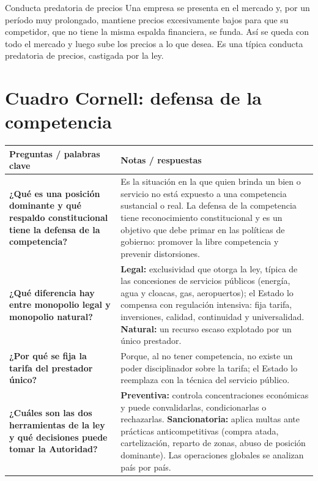 \documentclass[12pt,oneside]{book}
\newlength{\cornellizq}
\newlength{\cornellder}
\begin{document}
\begin{example}{Conducta predatoria de precios}
Una empresa se presenta en el mercado y, por un período muy prolongado, mantiene precios excesivamente bajos para que su competidor, que no tiene la misma espalda financiera, se funda. Así se queda con todo el mercado y luego sube los precios a lo que desea. Es una típica conducta predatoria de precios, castigada por la ley.
\end{example}

\section{Cuadro Cornell: defensa de la competencia}

\begin{longtable}{
    >{\raggedright\arraybackslash}p{\cornellizq}
    >{\raggedright\arraybackslash}p{\cornellder}
}
\toprule
\textbf{Preguntas / palabras clave} & \textbf{Notas / respuestas} \\
\midrule
\endhead

\textbf{¿Qué es una posición dominante y qué respaldo constitucional tiene la defensa de la competencia?} &
Es la situación en la que quien brinda un bien o servicio no está expuesto a una competencia sustancial o real. La defensa de la competencia tiene reconocimiento constitucional y es un objetivo que debe primar en las políticas de gobierno: promover la libre competencia y prevenir distorsiones. \\[0.8em]

\textbf{¿Qué diferencia hay entre monopolio legal y monopolio natural?} &
\textbf{Legal:} exclusividad que otorga la ley, típica de las concesiones de servicios públicos (energía, agua y cloacas, gas, aeropuertos); el Estado lo compensa con regulación intensiva: fija tarifa, inversiones, calidad, continuidad y universalidad. \textbf{Natural:} un recurso escaso explotado por un único prestador. \\[0.8em]

\textbf{¿Por qué se fija la tarifa del prestador único?} &
Porque, al no tener competencia, no existe un poder disciplinador sobre la tarifa; el Estado lo reemplaza con la técnica del servicio público. \\[0.8em]

\textbf{¿Cuáles son las dos herramientas de la ley y qué decisiones puede tomar la Autoridad?} &
\textbf{Preventiva:} controla concentraciones económicas y puede convalidarlas, condicionarlas o rechazarlas. \textbf{Sancionatoria:} aplica multas ante prácticas anticompetitivas (compra atada, cartelización, reparto de zonas, abuso de posición dominante). Las operaciones globales se analizan país por país. \\[0.8em]


\end{longtable}
\end{document}
